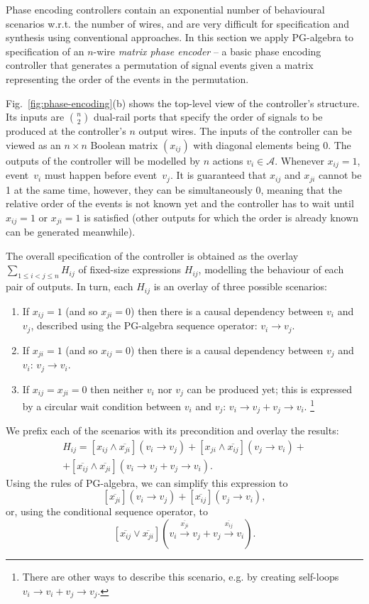 Phase encoding controllers contain an exponential number of behavioural
scenarios w.r.t. the number of wires, and are very difficult for specification
and synthesis using conventional approaches. In this section we apply
PG-algebra to specification of an $n$-wire \emph{matrix phase encoder}
-- a basic phase encoding controller that generates a permutation
of signal events given a matrix representing the order of the events
in the permutation.

Fig.~\ref{fig:phase-encoding}(b) shows the top-level view of the
controller's structure. Its inputs are ${n \choose 2}$ dual-rail
ports that specify the order of signals to be produced at the controller's
$n$ output wires. The inputs of the controller can be viewed as an
$n\times n$ Boolean matrix $(x_{ij})$ with diagonal elements being
0. The outputs of the controller will be modelled by $n$ actions
$v_{i}\in\mathcal{A}$. Whenever $x_{ij}=1$, event~$v_{i}$ must
happen before event~$v_{j}$. It is guaranteed that $x_{ij}$ and
$x_{ji}$ cannot be 1 at the same time, however, they can be simultaneously
0, meaning that the relative order of the events is not known yet
and the controller has to wait until $x_{ij}=1$ or $x_{ji}=1$ is
satisfied (other outputs for which the order is already known can
be generated meanwhile). 

The overall specification of the controller is obtained as the overlay
${\displaystyle \sum_{1\le i<j\le n}}H_{ij}$ of fixed-size expressions
$H_{ij}$, modelling the behaviour of each pair of outputs. In turn,
each $H_{ij}$ is an overlay of three possible scenarios:
\begin{enumerate}
\item If $x_{ij}=1$ (and so $x_{ji}=0$) then there is a causal dependency
between $v_{i}$ and $v_{j}$, described using the PG-algebra sequence
operator: $v_{i}\rightarrow v_{j}$. 
\item If $x_{ji}=1$ (and so $x_{ij}=0$) then there is a causal dependency
between $v_{j}$ and $v_{i}$: $v_{j}\rightarrow v_{i}$. 
\item If $x_{ij}=x_{ji}=0$ then neither $v_{i}$ nor $v_{j}$ can be produced
yet; this is expressed by a circular wait condition between $v_{i}$
and $v_{j}$: $v_{i}\rightarrow v_{j}+v_{j}\rightarrow v_{i}$.%
\footnote{There are other ways to describe this scenario, e.g. by creating self-loops
$v_{i}\rightarrow v_{i}+v_{j}\rightarrow v_{j}$.%
} 
\end{enumerate}
We prefix each of the scenarios with its precondition and overlay
the results:
\[
\begin{array}{c}
H_{ij}=[x_{ij}\wedge\overline{x_{ji}}](v_{i}\rightarrow v_{j})+[x_{ji}\wedge\overline{x_{ij}}](v_{j}\rightarrow v_{i})+\\
+[\overline{x_{ij}}\wedge\overline{x_{ji}}](v_{i}\rightarrow v_{j}+v_{j}\rightarrow v_{i}).
\end{array}
\]
Using the rules of PG-algebra, we can simplify this expression to
\[
[\overline{x_{ji}}](v_{i}\rightarrow v_{j})+[\overline{x_{ij}}](v_{j}\rightarrow v_{i}),
\]
or, using the conditional sequence operator, to
\[
[\overline{x_{ij}}\vee\overline{x_{ji}}](v_{i}\overset{\overline{x_{ji}}}{\longrightarrow}v_{j}+v_{j}\overset{\overline{x_{ij}}}{\longrightarrow}v_{i}).
\]


